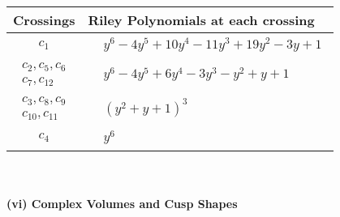\documentclass[1p]{elsarticle_modified}
\theoremstyle{definition}
\begin{document}
\begin{tabular}{m{50pt}|m{274pt}}
Crossings & \hspace{64pt}Riley Polynomials at each crossing \\
\hline $$\begin{aligned}c_{1}\end{aligned}$$&$\begin{aligned}
&y^6-4 y^5+10 y^4-11 y^3+19 y^2-3 y+1
\end{aligned}$\\
\hline $$\begin{aligned}c_{2},c_{5},c_{6}\\c_{7},c_{12}\end{aligned}$$&$\begin{aligned}
&y^6-4 y^5+6 y^4-3 y^3- y^2+y+1
\end{aligned}$\\
\hline $$\begin{aligned}c_{3},c_{8},c_{9}\\c_{10},c_{11}\end{aligned}$$&$\begin{aligned}
&(y^2+y+1)^3
\end{aligned}$\\
\hline $$\begin{aligned}c_{4}\end{aligned}$$&$\begin{aligned}
&y^6
\end{aligned}$\\
\hline
\end{tabular}\\~\\
\newpage\flushleft \textbf{(vi) Complex Volumes and Cusp Shapes}
\end{document}
